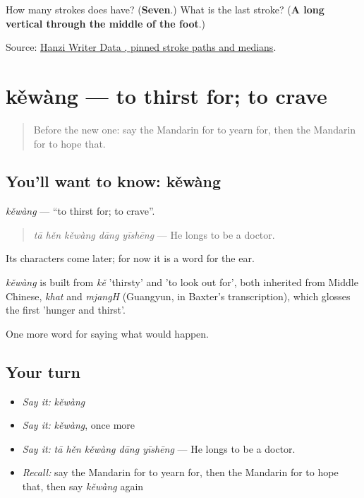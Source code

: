 \begin{tcolorbox}[breakable,colback=teal!4,colframe=teal!35!black,title={Before you move on}]
How many strokes does  have? (\textbf{Seven}.) What is the last stroke? (\textbf{A long vertical through the middle of the foot}.)

Source: \href{https://raw.githubusercontent.com/chanind/hanzi-writer-data/68d10a4b21150cae5e1ebbd223eed289cf32d90c/data/\%E5\%B8\%8C.json}{Hanzi Writer Data , pinned stroke paths and medians}.
\end{tcolorbox}
\section[kěwàng]{kěwàng — to thirst for; to crave}

\label{lesson:ZH-C533-kewang}



\begin{quote}
Before the new one: say the Mandarin for to yearn for, then the Mandarin for to hope that.
\end{quote}

\subsection*{You'll want to know: kěwàng}
\emph{kěwàng} — \textquotedblleft{}to thirst for; to crave\textquotedblright{}.

\begin{quote}
\emph{tā hěn kěwàng dāng yīshēng} — He longs to be a doctor.
\end{quote}

Its characters come later; for now it is a word for the ear.

\begin{cousinweb}
\emph{kěwàng} is built from \emph{kě} 'thirsty' and  'to look out for', both inherited from Middle Chinese, \emph{khat} and \emph{mjangH} (Guangyun, in Baxter's transcription), which glosses the first 'hunger and thirst'.
\end{cousinweb}

\begin{grammarlens}[title={What you've built}]
One more word for saying what would happen.
\end{grammarlens}

\subsection*{Your turn}
\begin{itemize}
\raggedright
  \item \emph{Say it:} \emph{kěwàng}
  \item \emph{Say it:} \emph{kěwàng}, once more
  \item \emph{Say it:} \emph{tā hěn kěwàng dāng yīshēng} — He longs to be a doctor.
  \item \emph{Recall:} say the Mandarin for to yearn for, then the Mandarin for to hope that, then say \emph{kěwàng} again
\end{itemize}

